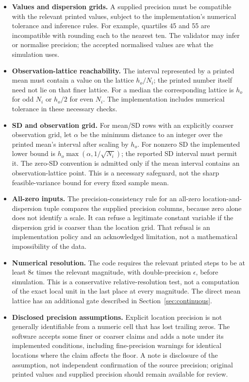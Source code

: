 \documentclass[11pt,a4paper]{article}
\begin{document}
\begin{itemize}
\item \textbf{Values and dispersion grids.} A supplied precision must be compatible with the relevant printed values, subject to the implementation's numerical tolerance and inference rules. For example, quartiles 45 and 55 are incompatible with rounding each to the nearest ten. The validator may infer or normalise precision; the accepted normalised values are what the simulation uses.
\item \textbf{Observation-lattice reachability.} The interval represented by a printed mean must contain a value on the lattice $h_o/N_i$; the printed number itself need not lie on that finer lattice. For a median the corresponding lattice is $h_o$ for odd $N_i$ or $h_o/2$ for even $N_i$. The implementation includes numerical tolerance in these necessary checks.
\item \textbf{SD and observation grid.} For mean/SD rows with an explicitly coarser observation grid, let $\alpha$ be the minimum distance to an integer over the printed mean's interval after scaling by $h_o$. For nonzero SD the implemented lower bound is $h_o\max(\alpha,1/\sqrt{N_i})$; the reported SD interval must permit it. The zero-SD convention is admitted only if the mean interval contains an observation-lattice point. This is a necessary safeguard, not the sharp feasible-variance bound for every fixed sample mean.
\item \textbf{All-zero inputs.} The precision-consistency rule for an all-zero location-and-dispersion tuple compares the supplied precision columns, because zero alone does not identify a scale. It can refuse a legitimate constant variable if the dispersion grid is coarser than the location grid. That refusal is an implementation policy and an acknowledged limitation, not a mathematical impossibility of the data.
\item \textbf{Numerical resolution.} The code requires the relevant printed steps to be at least $8\epsilon$ times the relevant magnitude, with double-precision $\epsilon$, before simulation. This is a conservative relative-resolution test, not a computation of the exact local unit in the last place at every magnitude. The direct mean lattice has an additional gate described in Section~\ref{sec:continuous}.
\item \textbf{Disclosed precision assumptions.} Explicit location precision is not generally identifiable from a numeric cell that has lost trailing zeros. The software accepts some finer or coarser claims and adds a note under its implemented conditions, including fine-precision warnings for identical locations where the claim affects the floor. A note is disclosure of the assumption, not independent confirmation of the source precision; original printed values and supplied precision should remain available for review.
\end{itemize}
\end{document}
